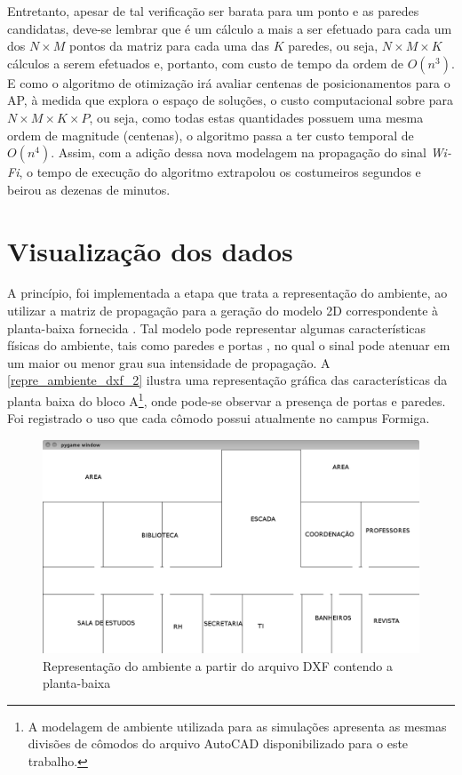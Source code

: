 \documentclass[
	12pt,				%
	twoside,			%
	a4paper,			%
	english,			%
	french,				%
	spanish,			%
	brazil				%
	]{abntex2}
\begin{document}
Entretanto, apesar de tal verificação ser barata para um ponto e as
paredes candidatas, deve-se lembrar que é um cálculo a mais a ser
efetuado para cada um dos \(N \times M\) pontos da matriz para cada uma
das \(K\) paredes, ou seja, \(N \times M \times K\) cálculos a serem
efetuados e, portanto, com custo de tempo da ordem de \(O(n^{3})\). E
como o algoritmo de otimização irá avaliar centenas de posicionamentos
para o AP, à medida que explora o espaço de soluções, o custo
computacional sobre para \(N \times M \times K \times P\), ou seja, como
todas estas quantidades possuem uma mesma ordem de magnitude (centenas),
o algoritmo passa a ter custo temporal de \(O(n^{4})\). Assim, com a
adição dessa nova modelagem na propagação do sinal \emph{Wi-Fi}, o tempo
de execução do algoritmo extrapolou os costumeiros segundos e beirou as
dezenas de minutos.

\section{Visualização dos dados}\label{visualizauxe7uxe3o-dos-dados}

A princípio, foi implementada a etapa que trata a representação do
ambiente, ao utilizar a matriz de propagação para a geração do modelo 2D
correspondente à planta-baixa fornecida \cite{KASE,THAKUR}. Tal modelo
pode representar algumas características físicas do ambiente, tais como
paredes e portas \cite{MARSCHALLINGER}, no qual o sinal pode atenuar em
um maior ou menor grau sua intensidade de propagação. A
\autoref{repre_ambiente_dxf_2} ilustra uma representação gráfica das
características da planta baixa do bloco A\footnote{A modelagem de
  ambiente utilizada para as simulações apresenta as mesmas divisões de
  cômodos do arquivo AutoCAD disponibilizado para o este trabalho.},
onde pode-se observar a presença de portas e paredes. Foi registrado o
uso que cada cômodo possui atualmente no campus Formiga.

\begin{figure}[ht]
    \caption{\label{repre_ambiente_dxf_2} Representação do ambiente a partir do arquivo DXF contendo a planta-baixa}
    \begin{center}
        \includegraphics[scale=0.4]{imagens/planta-labels.jpg}
    \end{center}
\end{figure}
\end{document}
